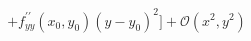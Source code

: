 \documentclass[preview]{standalone}
\begin{document}
\begin{align*}
+f_{y y}^{\prime \prime}(x_0, y_0)(y-y_0)^2]+\mathcal{O}(x^2,y^2)
\end{align*}
\end{document}
